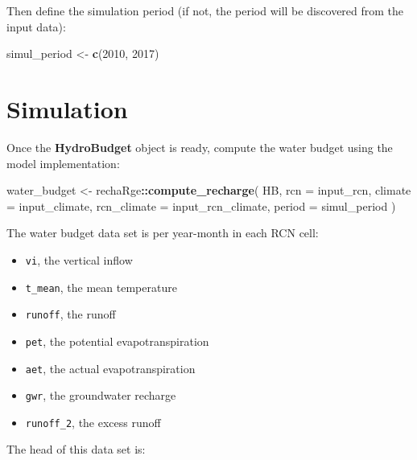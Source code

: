 \documentclass[
]{book}
\newenvironment{Shaded}{\begin{snugshade}}{\end{snugshade}}
\newcommand{\AttributeTok}[1]{\textcolor[rgb]{0.13,0.29,0.53}{#1}}
\newcommand{\DecValTok}[1]{\textcolor[rgb]{0.00,0.00,0.81}{#1}}
\newcommand{\FunctionTok}[1]{\textcolor[rgb]{0.13,0.29,0.53}{\textbf{#1}}}
\newcommand{\NormalTok}[1]{#1}
\newcommand{\OtherTok}[1]{\textcolor[rgb]{0.56,0.35,0.01}{#1}}
\newcommand{\SpecialCharTok}[1]{\textcolor[rgb]{0.81,0.36,0.00}{\textbf{#1}}}
\providecommand{\tightlist}{%
  \setlength{\itemsep}{0pt}\setlength{\parskip}{0pt}}
\begin{document}
Then define the simulation period (if not, the period will be discovered from the input data):

\begin{Shaded}
\begin{Highlighting}[]
\NormalTok{simul\_period }\OtherTok{\textless{}{-}} \FunctionTok{c}\NormalTok{(}\DecValTok{2010}\NormalTok{, }\DecValTok{2017}\NormalTok{)}
\end{Highlighting}
\end{Shaded}

\hypertarget{simulation-1}{%
\section{Simulation}\label{simulation-1}}

Once the \textbf{HydroBudget} object is ready, compute the water budget using the model implementation:

\begin{Shaded}
\begin{Highlighting}[]
\NormalTok{water\_budget }\OtherTok{\textless{}{-}}\NormalTok{ rechaRge}\SpecialCharTok{::}\FunctionTok{compute\_recharge}\NormalTok{(}
\NormalTok{  HB,}
  \AttributeTok{rcn =}\NormalTok{ input\_rcn,}
  \AttributeTok{climate =}\NormalTok{ input\_climate,}
  \AttributeTok{rcn\_climate =}\NormalTok{ input\_rcn\_climate,}
  \AttributeTok{period =}\NormalTok{ simul\_period}
\NormalTok{)}
\end{Highlighting}
\end{Shaded}

The water budget data set is per year-month in each RCN cell:

\begin{itemize}
\tightlist
\item
  \texttt{vi}, the vertical inflow
\item
  \texttt{t\_mean}, the mean temperature
\item
  \texttt{runoff}, the runoff
\item
  \texttt{pet}, the potential evapotranspiration
\item
  \texttt{aet}, the actual evapotranspiration
\item
  \texttt{gwr}, the groundwater recharge
\item
  \texttt{runoff\_2}, the excess runoff
\end{itemize}

The head of this data set is:
\end{document}
